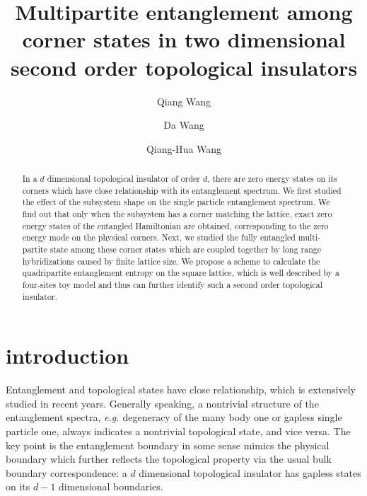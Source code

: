\documentclass[aps,twocolumn,superscriptaddress]{revtex4-1}
\newcommand{\eg}{\textit{e.g.{ }}}
\begin{document}
\title{Multipartite entanglement among corner states in two dimensional second order topological insulators}
\author{Qiang Wang}
\author{Da Wang}
\author{Qiang-Hua Wang}

\begin{abstract}
  In a $d$ dimensional topological insulator of order $d$, there are zero energy states on its 
  corners which have close relationship with its entanglement spectrum. 
  We first studied the effect of the subsystem shape on the single particle entanglement spectrum.
  We find out that only when the subsystem has a corner matching the lattice, exact zero energy states of the
  entangled Hamiltonian are obtained, corresponding to the zero energy mode on the physical corners.
  Next, we studied the fully entangled multi-partite state among these corner states which are coupled together
  by long range hybridizations caused by finite lattice size. We propose a scheme to calculate the quadripartite
  entanglement entropy on the square lattice, which is well described by a four-sites toy model 
  and thus can further identify such a second order topological insulator.
\end{abstract}
\maketitle
\section{introduction}
Entanglement and topological states have close relationship, which is extensively studied in recent years.
\cite{Zeng2015,Laflorencie2017}
Generally speaking, a nontrivial structure of the entanglement spectra, \eg degeneracy of the many body one 
or gapless single particle one, always indicates a nontrivial topological state, and vice versa.
\cite{Ryu2006, Fidkowski2010}
The key point is the entanglement boundary in some sense mimics the physical boundary which further reflects the
topological property via the usual bulk boundary correspondence: a $d$ dimensional topological insulator 
has gapless states on its $d-1$ dimensional boundaries.
\end{document}
